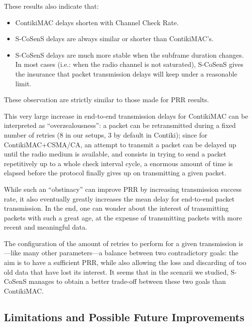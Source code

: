 \documentclass[conference]{IEEEtran}
\begin{document}
These results also indicate that:

\begin{itemize}

\item ContikiMAC delays shorten with Channel Check Rate.

\item S-CoSenS delays are always similar or shorter than ContikiMAC's.

\item S-CoSenS delays are much more stable when the subframe duration
      changes. In most cases (i.e.: when the radio channel is not saturated),
      S-CoSenS gives the insurance that packet transmission delays will keep
      under a reasonable limit.

\end{itemize}

These observation are strictly similar to those made for PRR results.

This very large increase in end-to-end transmission delays for ContikiMAC
can be interpreted as ``overzealousness'': a packet can be retransmitted
during a fixed number of retries (8 in our setups, 3 by default in Contiki);
since for ContikiMAC+CSMA/CA, an attempt to transmit a packet can be delayed
up until the radio medium is available, and consists in trying to send
a packet repetitively up to a whole check interval cycle, a enormous
amount of time is elapsed before the protocol finally gives up
on transmitting a given packet.

While such an ``obstinacy'' can improve PRR by increasing transmission
success rate, it also eventually greatly increases the mean delay for
end-to-end packet transmission. In the end, one can wonder about the
interest of transmitting packets with such a great age, at the expense
of transmitting packets with more recent and meaningful data.

The configuration of the amount of retries to perform for a given
transmission is---like many other parameters---a balance between two
contradictory goals: the aim is to have a sufficient PRR, while also
allowing the loss and discarding of too old data that have lost its
interest. It seems that in the scenarii we studied, S-CoSenS manages
to obtain a better trade-off between these two goals than ContikiMAC.



\subsection{Limitations and Possible Future Improvements}
\label{SectLimits}
\end{document}
